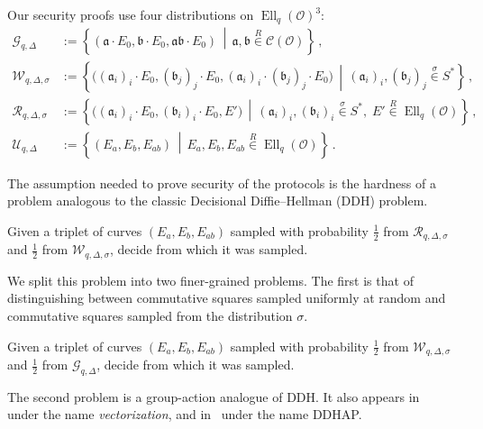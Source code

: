 \documentclass{llncs}
\newcommand{\Cl}{\mathcal{C}}
\renewcommand{\O}{\mathcal{O}}
\newcommand{\suchthat}{\,\middle\vert\,}
\renewcommand{\frak}{\mathfrak}
\newcommand{\rand}[1]{\overset{#1}{∈}}
\newcommand{\uni}{\rand{R}}
\DeclareMathOperator{\Ell}{Ell}
\begin{document}
Our security proofs use four distributions on $\Ell_q(\O)^3$:
\begin{align*}
    \mathcal{G}_{q,Δ} 
    & := 
    \left\{
        (\frak a·E_0,\frak b·E_0,\frak{ab}·E_0)
        \suchthat 
        \frak a,\frak b\uni\Cl(\O)
    \right\}
    \,, \\
    \mathcal{W}_{q,Δ,σ} 
    & := 
    \left\{
        \bigl((\frak a_i)_i·E_0,(\frak b_j)_j·E_0,(\frak a_i)_i·(\frak b_j)_j·E_0\bigr)
        \suchthat 
        (\frak a_i)_i,(\frak b_j)_j\rand{σ}S^*
    \right\}
    \,, \\
    \mathcal{R}_{q,Δ,σ} 
    & := 
    \left\{
        \bigl((\frak a_i)_i·E_0,(\frak b_i)_i·E_0,E'\bigr)
        \suchthat
        (\frak a_i)_i,(\frak b_i)_i\rand{σ}S^*,\; E'\uni\Ell_q(\O)
    \right\}
    \,, \\
    \mathcal{U}_{q,Δ} 
    & :=
    \left\{
        (E_a,E_b,E_{ab}) 
        \suchthat 
        E_a,E_b,E_{ab}\uni\Ell_q(\O)
    \right\}
    \,.
\end{align*}

The assumption needed to prove security of the protocols is 
the hardness of a problem analogous to 
the classic Decisional Diffie--Hellman (DDH) problem.

\begin{definition}
    Given a triplet of curves $(E_a,E_b,E_{ab})$
    sampled with probability $\frac{1}{2}$ 
    from $\mathcal{R}_{q,\Delta,\sigma}$
    and $\frac{1}{2}$ from $\mathcal{W}_{q,\Delta,\sigma}$,
    decide from which it was sampled. 
\end{definition}

We split this problem into two finer-grained problems. 
The first is that of distinguishing between 
commutative squares sampled uniformly at random 
and commutative squares sampled from the distribution $σ$.

\begin{definition}
    Given a triplet of curves $(E_a,E_b,E_{ab})$
    sampled with probability 
    $\frac{1}{2}$ from $\mathcal{W}_{q,Δ,σ}$
    and 
    $\frac{1}{2}$ from $\mathcal{G}_{q,Δ}$,
    decide from which it was sampled.
\end{definition}

The second problem is a group-action analogue of DDH.
It also appears in~\cite{cryptoeprint:2006:291} under the
name \emph{vectorization}, and in~\cite{Stol,Stolbunov2012} under the
name DDHAP.
 
\end{document}
